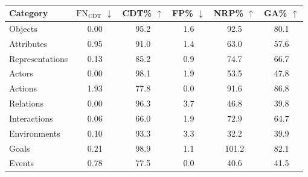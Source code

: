 \begin{table}[htbp]
\centering
\footnotesize
\begin{tabular}{l c c c c c}
\toprule
\textbf{Category} & $\text{FN}_\text{CDT}$ $\downarrow$ & CDT\% $\uparrow$ & FP\% $\downarrow$ & NRP\% $\uparrow$ & GA\% $\uparrow$ \\
\midrule
Objects        & 0.00 & 95.2 & 1.6 & 92.5  & 80.1 \\
Attributes     & 0.95 & 91.0 & 1.4 & 63.0  & 57.6 \\
Representations & 0.13 & 85.2 & 0.9 & 74.7  & 66.7 \\
Actors         & 0.00 & 98.1 & 1.9 & 53.5  & 47.8 \\
Actions        & 1.93 & 77.8 & 0.0 & 91.6  & 86.8 \\
Relations      & 0.00 & 96.3 & 3.7 & 46.8  & 39.8 \\
Interactions   & 0.06 & 66.0 & 1.9 & 72.9  & 64.7 \\
Environments   & 0.10 & 93.3 & 3.3 & 32.2  & 39.9 \\
Goals          & 0.21 & 98.9 & 1.1 & 101.2 & 82.1 \\
Events         & 0.78 & 77.5 & 0.0 & 40.6  & 41.5 \\
\bottomrule
\end{tabular}
\caption{}
\label{tab:combined_systemic_results}
\end{table}
